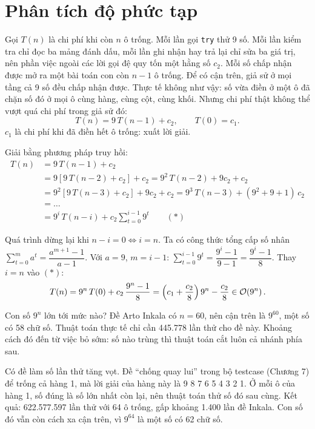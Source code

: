\section{Phân tích độ phức tạp}

Gọi \(T(n)\) là chi phí khi còn \(n\) ô trống. Mỗi lần gọi \texttt{try} thử 9 số. Mỗi lần kiểm tra chỉ đọc ba mảng đánh dấu, mỗi lần ghi nhận hay trả lại chỉ sửa ba giá trị, nên phần việc ngoài các lời gọi đệ quy tốn một hằng số \(c_2\). Mỗi số chấp nhận được mở ra một bài toán con còn \(n - 1\) ô trống. Để có cận trên, giả sử ở mọi tầng cả 9 số đều chấp nhận được. Thực tế không như vậy: số vừa điền ở một ô đã chặn số đó ở mọi ô cùng hàng, cùng cột, cùng khối. Nhưng chi phí thật không thể vượt quá chi phí trong giả sử đó:
\[
  T(n) = 9\,T(n - 1) + c_2, \qquad T(0) = c_1 .
\]
\(c_1\) là chi phí khi đã điền hết ô trống: xuất lời giải.

Giải bằng phương pháp truy hồi:
\begin{align*}
  T(n) &= 9\,T(n-1) + c_2 \\
       &= 9\left[9\,T(n-2) + c_2\right] + c_2 = 9^2\,T(n-2) + 9c_2 + c_2 \\
       &= 9^2\left[9\,T(n-3) + c_2\right] + 9c_2 + c_2 = 9^3\,T(n-3) + (9^2 + 9 + 1)\,c_2 \\
       &= \ldots \\
       &= 9^i\,T(n-i) + c_2 \sum_{t=0}^{i-1} 9^t \qquad (*)
\end{align*}

Quá trình dừng lại khi \(n - i = 0 \iff i = n\). Ta có công thức tổng cấp số nhân \(\sum_{t=0}^{m} a^t = \dfrac{a^{m+1} - 1}{a - 1}\). Với \(a = 9\), \(m = i - 1\): \(\sum_{t=0}^{i-1} 9^t = \dfrac{9^i - 1}{9 - 1} = \dfrac{9^i - 1}{8}\). Thay \(i = n\) vào \((*)\):
\[
  T(n) = 9^n\,T(0) + c_2\,\frac{9^n - 1}{8} = \left(c_1 + \frac{c_2}{8}\right) 9^n - \frac{c_2}{8} \in \mathcal{O}\!\left(9^n\right) .
\]

Con số \(9^n\) lớn tới mức nào? Đề Arto Inkala có \(n = 60\), nên cận trên là \(9^{60}\), một số có 58 chữ số. Thuật toán thực tế chỉ cần 445.778 lần thử cho đề này. Khoảng cách đó đến từ việc bỏ sớm: số nào trùng thì thuật toán cắt luôn cả nhánh phía sau.

Có đề làm số lần thử tăng vọt. Đề ``chống quay lui'' trong bộ testcase (Chương 7) để trống cả hàng 1, mà lời giải của hàng này là 9 8 7 6 5 4 3 2 1. Ở mỗi ô của hàng 1, số đúng là số lớn nhất còn lại, nên thuật toán thử số đó sau cùng. Kết quả: 622.577.597 lần thử với 64 ô trống, gấp khoảng 1.400 lần đề Inkala. Con số đó vẫn còn cách xa cận trên, vì \(9^{64}\) là một số có 62 chữ số.

